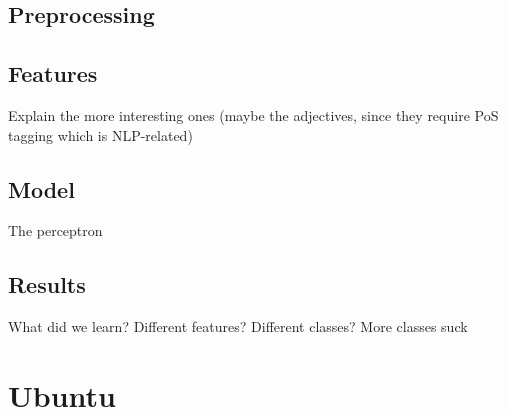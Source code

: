 \documentclass[
paper=128mm:96mm, %
fontsize=11pt, %
pagesize, %
parskip=half-, %
]{scrartcl} %
\theoremstyle{mythmstyle} %
\newtheorem{theorem}{Theorem}[section] %
\newcommand*{\mybox}[2]{ %
\par\noindent
\begin{tikzpicture}[mynodestyle/.style={rectangle,draw=mygreen,thick,inner sep=2mm,text justified,top color=white,bottom color=white,above}]\node[mynodestyle,at={(0.5*#1+2mm+0.4pt,0)}]{ %
\begin{minipage}[t]{#1}
#2
\end{minipage}
};
\end{tikzpicture}
\par\vspace{-1.3em}}
\begin{document}
\clearpage


\subsection*{Preprocessing}


\begin{comment}
How to include a theorem in this presentation:
\begin{verbatim}
\mybox{0.8\textwidth}{
\begin{theorem}[Murphy (1949)]
Anything that can go wrong, will go wrong.
\end{theorem}
}
\end{verbatim}
\end{comment}

\clearpage


\subsection*{Features}

Explain the more interesting ones (maybe the adjectives, since they require PoS tagging which is NLP-related)

\clearpage


\subsection*{Model}


The perceptron


\clearpage


\subsection*{Results}


What did we learn? Different features? Different classes? More classes suck


\clearpage



\section{Ubuntu}
\end{document}

